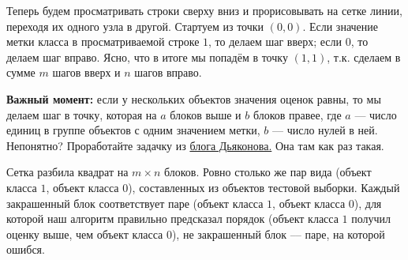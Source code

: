 \documentclass[12pt, a4paper, oneside]{article}
\theoremstyle{plain} %
\theoremstyle{definition}
\newcommand{\indef}[1]{\textbf{ \color{green} #1}}
\begin{document}
\begin{solution}
\begin{enumerate}
	Теперь будем просматривать строки сверху вниз и прорисовывать на сетке линии, переходя их одного узла в другой. Стартуем из точки $(0, 0)$. Если значение метки класса в просматриваемой строке $1$, то делаем шаг вверх; если $0$, то делаем шаг вправо. Ясно, что в итоге мы попадём в точку $(1, 1)$, т.к. сделаем в сумме $m$ шагов вверх и $n$ шагов вправо.
		
\begin{center}
\end{center}
    
    \indef{Важный момент:} если у нескольких объектов значения оценок равны, то мы делаем шаг в точку, которая на $a$ блоков выше и $b$ блоков правее, где $a$ --- число единиц в группе объектов с одним значением метки, $b$ --- число нулей в ней. Непонятно? Проработайте задачку из \href{ https://dyakonov.org/2017/07/28/}{блога Дьяконова.} Она там как раз такая. 
  
	Сетка разбила квадрат на  $m \times n$ блоков. Ровно столько же пар вида (объект класса $1$, объект класса $0$), составленных из объектов тестовой выборки. Каждый закрашенный блок соответствует паре (объект класса $1$, объект класса $0$), для которой наш алгоритм правильно предсказал порядок (объект класса $1$ получил оценку выше, чем объект класса $0$), не закрашенный блок --– паре, на которой ошибся.
	

\end{enumerate}
\end{solution}
\end{document}
